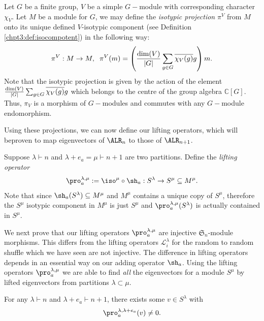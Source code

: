 \documentclass[11pt]{report}
\begin{document}
\begin{defn}
	Let $G$ be a finite group, $V$ be a simple $G-$module with 
	corresponding character 
	$\chi_{V}$. Let $M$ be a module for $G$, we may define the 
	\emph{isotypic projection} $\pi^{V}$ from $M$ onto its unique defined $V$-isotypic 
	component (see Definition \ref{chpt3:def:isocompotent}) in the 
	following way:
	\[\pi^{V}:M \rightarrow M, \hspace{0.2cm} \pi^{V}(m)  = \left( 
	\frac{\textnormal{dim}(V)}{|G|}\sum_{g\in G} \overline{\chi_{V}(g)} g 
	\right) m.\] 
	Note that the isotypic projection is given by the action of the element 
	$\frac{\textnormal{dim}(V)}{|G|}\sum_{g\in G} \overline{\chi_{V}(g)} g$ 
	which belongs to the centre of the group algebra $\mathbb{C}[G]$. Thus, 
	$\pi_{V}$ is a morphism of $G-$modules and commutes with any $G-$module 
	endomorphism.
\end{defn}





Using these projections, we can now define our lifting operators, which will beproven to map eigenvectors of $\ALR_{n}$ 
to those of $\ALR_{n+1}$. 



\begin{defn}
	\label{chpt5:def:liftingmaps}
	Suppose $\lambda \vdash n$ and $\lambda + e_{a} = \mu \vdash n+1$ are 
	two 
	partitions. 	
	Define the \emph{lifting operator} 
	$$
	\pro_{a}^{\lambda,\mu} := \iso^{\mu} \circ \sh_{a}:S^{\lambda} 
	\rightarrow S^{\mu}\subseteq M^\mu.
	$$ 
	Note that since $\sh_a(S^\lambda)\subseteq M^\mu$ and $M^\mu$ contains 
	a unique copy of $S^\mu$, therefore the $S^{\mu}$ isotypic component in $M^{\mu}$ is just $S^{\mu}$ and $\pro_a^{\lambda,\mu}(S^{\lambda})$ is actually contained in $S^\mu$.
\end{defn}



We next prove that our lifting operators $\pro_{a}^{\lambda,\mu}$ are injective $\mathfrak{S}_{n}$-module morphisms. This differs from the lifting operators $\mathcal{L}_{i}^{\lambda}$ for the random to random shuffle which we have seen are not injective. The difference in lifting operators depends in an essential way on our adding operator $\sh_{a}$. 	Using the lifting operators $\pro_{a}^{\lambda,\mu}$ we are able 
to find \emph{all} the eigenvectors for a module $S^{\mu}$ by  lifted eigenvectors from partitions $\lambda \subset \mu$. 

\begin{corollary}
	\label{nonzero}
	For any $\lambda \vdash n$ and $\lambda+e_{a} \vdash n+1$, there exists 
	some $v \in S^{\lambda}$ with
	\[\pro^{\lambda,\lambda+e_{a}}_{a}(v) \neq 0. \]
\end{corollary}
\end{document}
